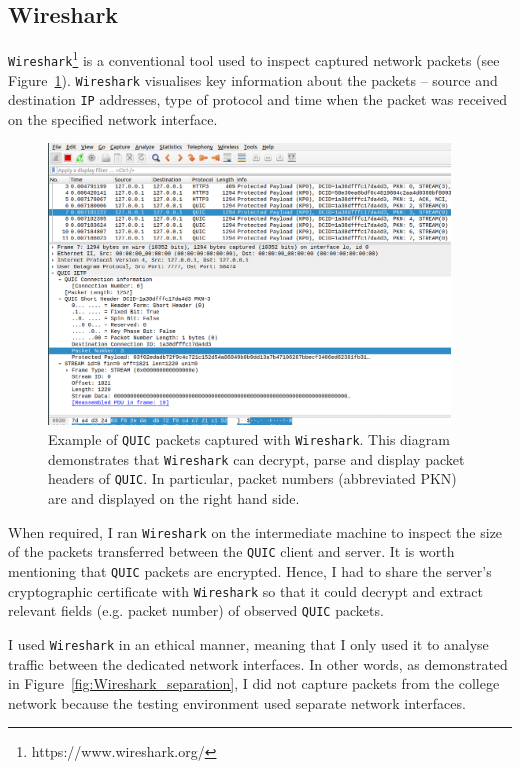 \documentclass[12pt,a4paper,twoside,openright]{report}
\begin{document}
\subsection{Wireshark}

\texttt{Wireshark}\footnote{https://www.wireshark.org/} is a conventional tool used to inspect captured network packets (see Figure~\ref{fig:Wireshark_screenshot}).
\texttt{Wireshark} visualises key information about the packets -- source and destination \texttt{IP} addresses, type of protocol and time when the packet was received on the specified network interface.

    \begin{figure}[H]
    \centering
    \includegraphics[width=0.95\textwidth]{figs/Wireshark_screenshot.png}
    \caption[Example of \texttt{QUIC} packets captured with \texttt{Wireshark}]{Example of \texttt{QUIC} packets captured with \texttt{Wireshark}. This diagram demonstrates that \texttt{Wireshark} can decrypt, parse and display packet headers of \texttt{QUIC}. In particular, packet numbers (abbreviated PKN) are and displayed on the right hand side.}
    \label{fig:Wireshark_screenshot}
    \end{figure}
    
When required, I ran \texttt{Wireshark} on the intermediate machine to inspect the size of the packets transferred between the \texttt{QUIC} client and server.
It is worth mentioning that \texttt{QUIC} packets are encrypted.
Hence, I had to share the server's cryptographic certificate with \texttt{Wireshark} so that it could decrypt and extract relevant fields (e.g. packet number) of observed \texttt{QUIC} packets.

I used \texttt{Wireshark} in an ethical manner, meaning that I only used it to analyse traffic between the dedicated network interfaces.
In other words, as demonstrated in Figure~\ref{fig:Wireshark_separation}, I did not capture packets from the college network because the testing environment used separate network interfaces. 
\end{document}
